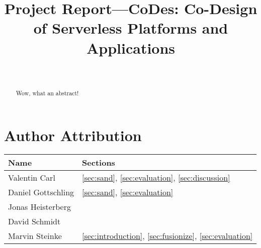 \documentclass[a4paper, twoside]{IEEEtran}
\begin{document}
\title{Project Report—CoDes: Co-Design of Serverless Platforms and Applications}

\author{
    \\
}

\maketitle
\thispagestyle{plain}
\pagestyle{plain}

\begin{abstract}
    Wow, what an abstract!
\end{abstract}

\setcounter{tocdepth}{1}
\tableofcontents














\section*{Author Attribution}


\vspace{1em}
\begin{center}
    \begin{tabular}{l l} \toprule
        Name & Sections \\ \midrule
        Valentin Carl & \ref{sec:sand}, \ref{sec:evaluation}, \ref{sec:discussion} \\
        Daniel Gottschling & \ref{sec:sand}, \ref{sec:evaluation} \\
        Jonas Heisterberg & \\
        David Schmidt & \\
        Marvin Steinke & \ref{sec:introduction}, \ref{sec:fusionize}, \ref{sec:evaluation} \\ \bottomrule
    \end{tabular}
\end{center}
\end{document}
